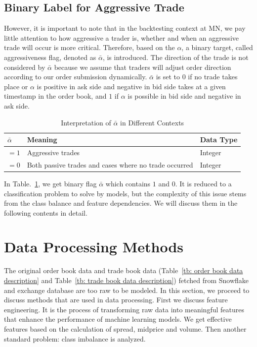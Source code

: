 \subsection{Binary Label for Aggressive Trade} \label{sec: aflag}
However, it is important to note that in the backtesting context at MN, we pay little attention to how aggressive a trader is, whether and when an aggressive trade will occur is more critical. Therefore, based on the $\alpha$, a binary target, called aggressiveness flag, denoted as $\bar{\alpha}$, is introduced. The direction of the trade is not considered by $\bar{\alpha}$ because we assume that traders will adjust order direction according to our order submission dynamically. $\bar{\alpha}$ is set to $0$ if no trade takes place or $\alpha$ is positive in ask side and negative in bid side takes at a given timestamp in the order book, and $1$ if $\alpha$ is possible in bid side and negative in ask side. 
\begin{table}[h] 
    \centering 
    \begin{tabular}{lll} 
        \toprule 
        \textbf{$\bar{\alpha}$} & \textbf{Meaning} & \textbf{Data Type} \\ 
        \midrule 
        $ = 1$ & Aggressive trades & Integer \\
        $ = 0$ & Both passive trades and cases where no trade occurred & Integer \\  
        \bottomrule 
    \end{tabular} 
    \caption{Interpretation of $\bar{\alpha}$ in Different Contexts}
    \label{tb: aflag_meaning}
\end{table}
In Table.~\ref{tb: aflag_meaning}, we get binary flag $\bar{\alpha}$ which contains $1$ and $0$. It is reduced to a classification problem to solve by models, but the complexity of this issue stems from the class balance and feature dependencies. We will discuss them in the following contents in detail.

\section{Data Processing Methods}
The original order book data and trade book data (Table~\ref{tb: order book data description} and Table~\ref{tb: trade book data description}) fetched from Snowflake and exchange database are too raw to be modeled. In this section, we proceed to discuss methods that are used in data processing. First we discuss feature engineering. It is the process of transforming raw data into meaningful features that enhance the performance of machine learning models. We get effective features based on the calculation of spread, midprice and volume. Then another standard problem: class imbalance is analyzed.

